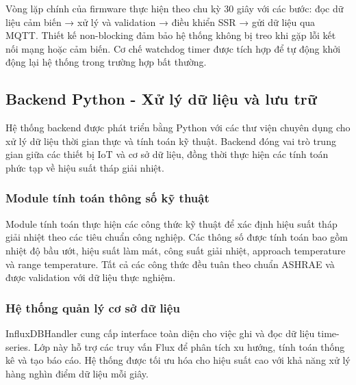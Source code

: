 \documentclass[../main.tex]{subfiles}
\begin{document}
Vòng lặp chính của firmware thực hiện theo chu kỳ 30 giây với các bước: đọc dữ liệu cảm biến → xử lý và validation → điều khiển SSR → gửi dữ liệu qua MQTT. Thiết kế non-blocking đảm bảo hệ thống không bị treo khi gặp lỗi kết nối mạng hoặc cảm biến. Cơ chế watchdog timer được tích hợp để tự động khởi động lại hệ thống trong trường hợp bất thường.



\subsection{Backend Python - Xử lý dữ liệu và lưu trữ}
\label{sec:python_backend}

Hệ thống backend được phát triển bằng Python với các thư viện chuyên dụng cho xử lý dữ liệu thời gian thực và tính toán kỹ thuật. Backend đóng vai trò trung gian giữa các thiết bị IoT và cơ sở dữ liệu, đồng thời thực hiện các tính toán phức tạp về hiệu suất tháp giải nhiệt.

\subsubsection{Module tính toán thông số kỹ thuật}
\label{sec:technical_calculations}

Module tính toán thực hiện các công thức kỹ thuật để xác định hiệu suất tháp giải nhiệt theo các tiêu chuẩn công nghiệp. Các thông số được tính toán bao gồm nhiệt độ bầu ướt, hiệu suất làm mát, công suất giải nhiệt, approach temperature và range temperature. Tất cả các công thức đều tuân theo chuẩn ASHRAE và được validation với dữ liệu thực nghiệm.



\subsubsection{Hệ thống quản lý cơ sở dữ liệu}
\label{sec:database_management}

InfluxDBHandler cung cấp interface toàn diện cho việc ghi và đọc dữ liệu time-series. Lớp này hỗ trợ các truy vấn Flux để phân tích xu hướng, tính toán thống kê và tạo báo cáo. Hệ thống được tối ưu hóa cho hiệu suất cao với khả năng xử lý hàng nghìn điểm dữ liệu mỗi giây.
\end{document}
